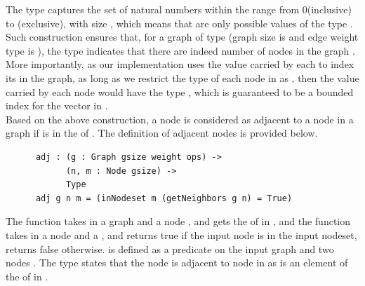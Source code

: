 The type  captures the set of natural numbers within the range from 0(inclusive) to (exclusive), with size , which means that are only  possible values of the type . Such construction ensures that, for a graph  of type  (graph size is  and edge weight type is ), the type  indicates that there are indeed  number of nodes in the graph . More importantly, as our implementation uses the value carried by each  to index its  in the graph, as long as we restrict the type of each node in  as , then the value carried by each node would have the type , which is guaranteed to be a bounded index for the vector  in . 
\\

Based on the above construction, a node  is considered as adjacent to a node  in a graph  if  is in the  of . The definition of adjacent nodes is provided below. 
\begin{lstlisting}
      adj : (g : Graph gsize weight ops) ->
            (n, m : Node gsize) -> 
            Type
      adj g n m = (inNodeset m (getNeighbors g n) = True)
\end{lstlisting}

The  function takes in a graph  and a node , and gets the  of  in , and the  function takes in a node and a , and returns true if the input node is in the input nodeset, returns false otherwise.  is defined as a predicate on the input graph  and two nodes . The type  states that the node  is adjacent to node  in  as  is an element of the  of  in . 
\\

